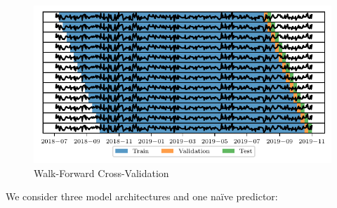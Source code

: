 \documentclass[review, authoryear]{elsarticle}
\begin{document}
\begin{figure}
	\centering
	\includegraphics[width=\textwidth]{crossval.pdf}
	\caption{Walk-Forward Cross-Validation}
	\label{fig:walkforward}
\end{figure}

We consider three model architectures and one naïve predictor:
\end{document}
